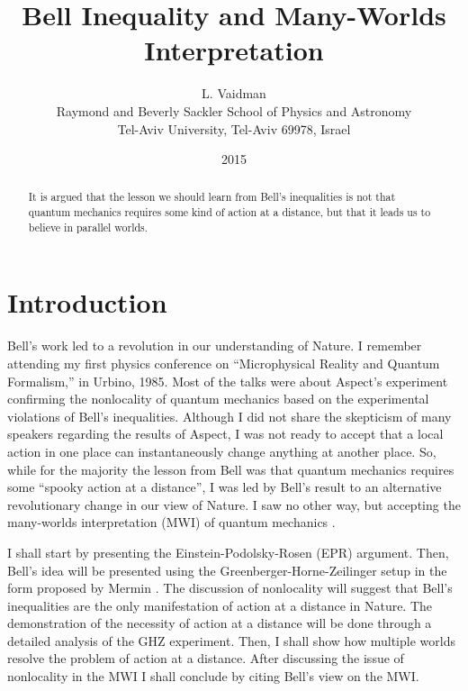 \documentclass[12pt]{article}
\begin{document}
\title{Bell Inequality and  Many-Worlds Interpretation}
\author{L. Vaidman \\ Raymond and Beverly Sackler School of Physics and Astronomy \\ Tel-Aviv University, Tel-Aviv 69978, Israel}
\date{2015}
\maketitle

\begin{abstract}
It is argued that the lesson we should learn from Bell's inequalities is not that quantum mechanics requires some kind of action at a distance, but that it leads us to believe in parallel worlds.
\end{abstract}


\section{Introduction}

  Bell's work \cite{Bell64} led to a revolution in our understanding of Nature.
I remember   attending my first physics conference on ``Microphysical Reality and Quantum Formalism,'' in Urbino, 1985. Most of the talks were about  Aspect's experiment \cite{Aspect} confirming the nonlocality of quantum mechanics based on the experimental violations of Bell's inequalities. Although I did not share the skepticism of many speakers regarding the results of Aspect, I was not ready to accept that a local action in one place can instantaneously change anything at another place. So, while for the majority the lesson from Bell was that  quantum mechanics requires some ``spooky action at a distance'', I was led by Bell's result to an alternative revolutionary change in our view of Nature. I saw no other way, but accepting  the many-worlds interpretation (MWI) of quantum mechanics \cite{Eve,SEP}.

I shall start by presenting the Einstein-Podolsky-Rosen (EPR) \cite{EPR} argument. Then, Bell's idea will be presented using the Greenberger-Horne-Zeilinger setup \cite{GHZ} in the form proposed by Mermin \cite{Mermin,myGHZ}.  The discussion of nonlocality will suggest that Bell's inequalities are the only manifestation of action at a distance in Nature. The demonstration of the necessity of action at a distance  will be done through a detailed analysis of the GHZ experiment. Then, I shall show  how multiple worlds resolve the problem of action at a distance. After discussing the issue of nonlocality in the MWI  I shall conclude by  citing Bell's view on the MWI.
\end{document}
